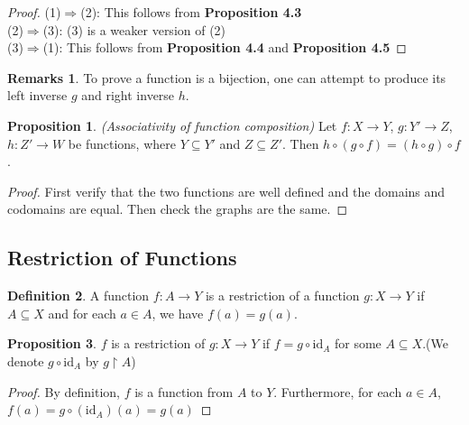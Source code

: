 \documentclass[14pt]{article}
\theoremstyle{definition}
\newtheorem*{remark}{Remarks}
\newtheorem{definition}{Definition}[subsection]
\newtheorem{proposition}[definition]{Proposition}
\begin{document}
\begin{proof}
(1)$\Rightarrow$(2): This follows from \textbf{Proposition 4.3}\\
(2)$\Rightarrow$(3): (3) is a weaker version of (2)\\
(3)$\Rightarrow$(1): This follows from  \textbf{Proposition 4.4} and  \textbf{Proposition 4.5}
\end{proof}
\begin{remark}
    To prove a function is a bijection, one can attempt to produce its left inverse $g$ and right inverse $h$. 
\end{remark}

\vspace{3mm} %
\begin{proposition}
    \textit{(Associativity of function composition)} Let  $f\colon X\rightarrow Y$,  $g\colon Y'\rightarrow Z$,   $h\colon Z'\rightarrow W$ be functions, where $Y\subseteq Y'$ and $Z\subseteq Z'$. Then $h\circ (g\circ f)=(h\circ g)\circ f$.
\end{proposition}
\begin{proof}
    First verify that the two functions are well defined and the domains and codomains are equal.
    Then check the graphs are the same.
\end{proof}

\vspace{5mm} %

\subsection{Restriction of Functions}

\begin{definition}
   A function $f\colon A\rightarrow Y$ is a restriction of a function $g\colon X\rightarrow Y$ if $A\subseteq X$ and for each $a\in A$, we have $f(a)=g(a)$.
\end{definition}

\vspace{1mm} %

\begin{proposition}
    $f$ is a restriction of $g\colon X\rightarrow Y$ if $f=g\circ\mathrm{id}_A$ for some $A\subseteq X$.(We denote $g\circ\mathrm{id}_A$ by $g\upharpoonright A$)
\end{proposition}
\begin{proof}
 By definition, $f$ is a function from $A$ to $Y$. Furthermore, for each $a\in A$,  $f(a)=g\circ(\mathrm{id}_A)(a)=g(a)$
\end{proof}
\end{document}
